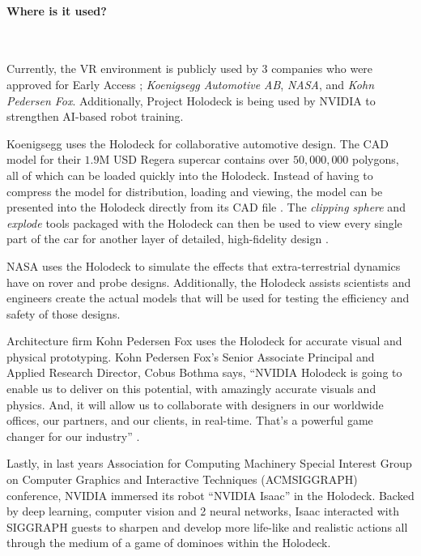 \documentclass[11pt]{article}
\begin{document}
\paragraph{Where is it used?} ~ \par 
Currently, the VR environment is publicly used by 3 companies who were approved for Early Access \cite{nvidiamain}; \textit{Koenigsegg Automotive AB}, \textit{NASA}, and \textit{Kohn Pedersen Fox}. Additionally, Project Holodeck is being used by NVIDIA to strengthen AI-based robot training. \par
Koenigsegg uses the Holodeck for collaborative automotive design. The CAD model for their $1.9$M USD Regera supercar contains over $50,000,000$ polygons, all of which can be loaded quickly into the Holodeck. Instead of having to compress the model for distribution, loading and viewing, the model can be presented into the Holodeck directly from its CAD file \cite{nvidiamain}. The \textit{clipping sphere} and \textit{explode} tools packaged with the Holodeck can then be used to view every single part of the car for another layer of detailed, high-fidelity design \cite{nvidiablog3}.  \par
NASA uses the Holodeck to simulate the effects that extra-terrestrial dynamics have on rover and probe designs. Additionally, the Holodeck assists scientists and engineers create the actual models that will be used for testing the efficiency and safety of those designs. \cite{nvidiamain} \par
Architecture firm Kohn Pedersen Fox uses the Holodeck for accurate visual and physical prototyping.  Kohn Pedersen Fox's Senior Associate Principal and Applied Research Director, Cobus Bothma says, ``NVIDIA Holodeck is going to enable us to deliver on this potential, with amazingly accurate visuals and physics. And, it will allow us to collaborate with designers in our worldwide offices, our partners, and our clients, in real-time. That’s a powerful game changer for our industry'' \cite{nvidiamain}. \par
Lastly, in last years Association for Computing Machinery Special Interest Group on Computer Graphics and Interactive Techniques (ACMSIGGRAPH) conference, NVIDIA immersed its robot ``NVIDIA Isaac'' in the Holodeck. Backed by deep learning, computer vision and 2 neural networks, Isaac interacted with SIGGRAPH guests to sharpen and develop more life-like and realistic actions \cite{nvidiablog3} all through the medium of a game of dominoes within the Holodeck. 
	
\end{document}
